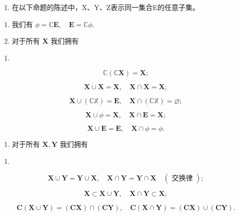 \begin{enumerate}
\def\labelenumi{\arabic{enumi}.}
\setcounter{enumi}{13}
\tightlist
\item
  在以下命题的陈述中，X、Y、Z表示同一集合E的任意子集。
\end{enumerate}

\begin{enumerate}
\def\labelenumi{(\alph{enumi})}
\item
  我们有 \(\phi = \mathbb{C}\mathbf{E},\quad \mathbf{E} = \mathbb{C}\phi .\)
\item
  对于所有 \(\mathbf{X}\) 我们拥有
\end{enumerate}

\begin{enumerate}
\def\labelenumi{(\arabic{enumi})}
\tightlist
\item
\end{enumerate}

\[
\mathbb {C} (\mathbb {C} \mathbf {X}) = \mathbf {X};\tag{2}
\]

\[
\mathbf {X} \cup \mathbf {X} = \mathbf {X}, \quad \mathbf {X} \cap \mathbf {X} = \mathbf {X};\tag{3}
\]

\[
\mathbf {X} \cup (\mathbb {C X}) = \mathbf {E}, \quad \mathbf {X} \cap (\mathbb {C X}) = \varnothing ;\tag{4}
\]

\[
\mathbf {X} \cup \phi = \mathbf {X}, \quad \mathbf {X} \cap \mathbf {E} = \mathbf {X};\tag{5}
\]

\[
\mathbf {X} \cup \mathbf {E} = \mathbf {E}, \quad \mathbf {X} \cap \phi = \phi .
\]

\begin{enumerate}
\def\labelenumi{(\alph{enumi})}
\setcounter{enumi}{2}
\tightlist
\item
  对于所有 \(\mathbf{X},\mathbf{Y}\) 我们拥有
\end{enumerate}

\begin{enumerate}
\def\labelenumi{(\arabic{enumi})}
\setcounter{enumi}{5}
\tightlist
\item
\end{enumerate}

\[
\mathbf {X} \cup \mathbf {Y} = \mathbf {Y} \cup \mathbf {X}, \quad \mathbf {X} \cap \mathbf {Y} = \mathbf {Y} \cap \mathbf {X} \quad (\text { 交换律 });\tag{7}
\]

\[
\mathbf {X} \subset \mathbf {X} \cup \mathbf {Y}, \quad \mathbf {X} \cap \mathbf {Y} \subset \mathbf {X};\tag{8}
\]

\[
\mathbf {C} (\mathbf {X} \cup \mathbf {Y}) = (\mathbf {C X}) \cap (\mathbf {C Y}), \quad \mathbf {C} (\mathbf {X} \cap \mathbf {Y}) = (\mathbf {C X}) \cup (\mathbf {C Y}).
\]

